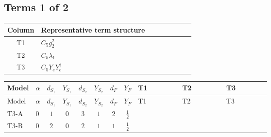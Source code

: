 \documentclass[8pt]{article}
\begin{document}
\begin{landscape}
\subsection*{Terms 1 of 2}
\begin{center}
\begin{tabular}{@{}c >{\raggedright\arraybackslash}p{0.82\linewidth}@{}}
\toprule
Column & Representative term structure \\
\midrule
T1 & \(\displaystyle C_{5} g_{2}^{2}\) \\
\midrule
T2 & \(\displaystyle C_{5} \lambda_1\) \\
\midrule
T3 & \(\displaystyle C_{5} Y_e Y_e^\dagger\) \\
\midrule
\bottomrule
\end{tabular}
\end{center}
\smallskip
\tiny
\begin{longtable}{@{}llcccccc >{\raggedright\arraybackslash}p{0.21\linewidth} >{\raggedright\arraybackslash}p{0.21\linewidth} >{\raggedright\arraybackslash}p{0.21\linewidth}@{}}
\toprule
Model & $\alpha$ & $d_{S_1}$ & $Y_{S_1}$ & $d_{S_2}$ & $Y_{S_2}$ & $d_F$ & $Y_F$ & T1 & T2 & T3 \\
\midrule
\endfirsthead
\toprule
Model & $\alpha$ & $d_{S_1}$ & $Y_{S_1}$ & $d_{S_2}$ & $Y_{S_2}$ & $d_F$ & $Y_F$ & T1 & T2 & T3 \\
\midrule
\endhead
T3-A & $0$ & $1$ & $0$ & $3$ & $1$ & $2$ & $\frac{1}{2}$ & \scriptsize\adjustbox{max width=\linewidth}{$\begin{gathered} - 3 C_{5} g_{2}^{2}\end{gathered}$} & \scriptsize\adjustbox{max width=\linewidth}{$\begin{gathered} 2 C_{5} \lambda_1\end{gathered}$} & \scriptsize\adjustbox{max width=\linewidth}{$\begin{gathered} - C_{5} Y_e Y_e^\dagger\end{gathered}$} \\
\midrule
T3-B & $0$ & $2$ & $0$ & $2$ & $1$ & $1$ & $\frac{1}{2}$ & \scriptsize\adjustbox{max width=\linewidth}{$\begin{gathered} - 3 C_{5} g_{2}^{2}\end{gathered}$} & \scriptsize\adjustbox{max width=\linewidth}{$\begin{gathered} 2 C_{5} \lambda_1\end{gathered}$} & \scriptsize\adjustbox{max width=\linewidth}{$\begin{gathered} - C_{5} Y_e Y_e^\dagger\end{gathered}$} \\

\end{longtable}
\end{landscape}
\end{document}
